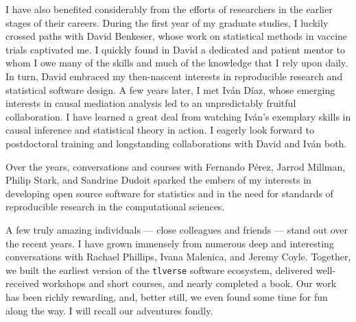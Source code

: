 \documentclass{ucbthesis}
\begin{document}
\begin{frontmatter}
\begin{acknowledgements}
I have also benefited considerably from the efforts of researchers in the
earlier stages of their careers. During the first year of my graduate studies,
I luckily crossed paths with David Benkeser, whose work on statistical methods
in vaccine trials captivated me. I quickly found in David a dedicated and
patient mentor to whom I owe many of the skills and much of the knowledge that
I rely upon daily. In turn, David embraced my then-nascent interests in
reproducible research and statistical software design.
A few years later, I met Iv\'{a}n D\'{i}az, whose emerging interests in causal
mediation analysis led to an unpredictably fruitful collaboration. I have
learned a great deal from watching Iv\'{a}n's exemplary skills in causal
inference and statistical theory in action.
I eagerly look forward to postdoctoral training and longstanding collaborations
with David and Iv\'{a}n both.

Over the years, conversations and courses with Fernando P{\'e}rez, Jarrod
Millman, Philip Stark, and Sandrine Dudoit sparked the embers of my interests in
developing open source software for statistics and in the need for standards of
reproducible research in the computational sciences.

A few truly amazing individuals --- close colleagues and friends --- stand out
over the recent years. I have grown immensely from numerous deep and interesting
conversations with Rachael Phillips, Ivana Malenica, and Jeremy Coyle. Together,
we built the earliest version of the \texttt{tlverse} software ecosystem,
delivered well-received workshops and short courses, and nearly completed
a book. Our work has been richly rewarding, and, better still, we even found
some time for fun along the way. I will recall our adventures fondly.

\end{acknowledgements}

\end{frontmatter}

\pagestyle{headings}








\printbibliography
\end{document}
